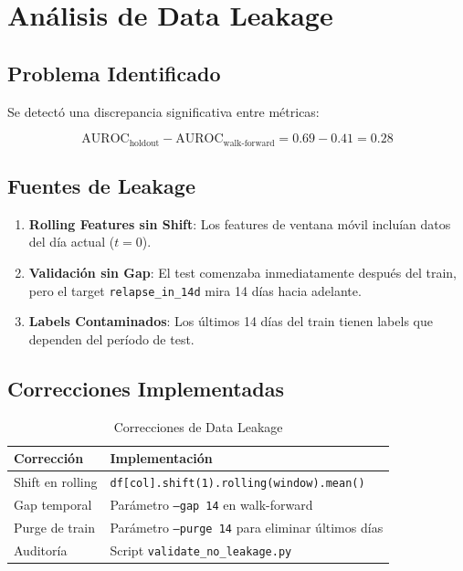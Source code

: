\documentclass[11pt,a4paper]{article}
\begin{document}
\section{Análisis de Data Leakage}

\subsection{Problema Identificado}

Se detectó una discrepancia significativa entre métricas:

\begin{equation}
\text{AUROC}_{\text{holdout}} - \text{AUROC}_{\text{walk-forward}} = 0.69 - 0.41 = 0.28
\end{equation}

\subsection{Fuentes de Leakage}

\begin{enumerate}
    \item \textbf{Rolling Features sin Shift}: Los features de ventana móvil incluían datos del día actual ($t=0$).
    
    \item \textbf{Validación sin Gap}: El test comenzaba inmediatamente después del train, pero el target \texttt{relapse\_in\_14d} mira 14 días hacia adelante.
    
    \item \textbf{Labels Contaminados}: Los últimos 14 días del train tienen labels que dependen del período de test.
\end{enumerate}

\subsection{Correcciones Implementadas}

\begin{table}[H]
\centering
\caption{Correcciones de Data Leakage}
\begin{tabular}{lp{8cm}}
\toprule
\textbf{Corrección} & \textbf{Implementación} \\
\midrule
Shift en rolling & \texttt{df[col].shift(1).rolling(window).mean()} \\
Gap temporal & Parámetro \texttt{--gap 14} en walk-forward \\
Purge de train & Parámetro \texttt{--purge 14} para eliminar últimos días \\
Auditoría & Script \texttt{validate\_no\_leakage.py} \\
\bottomrule
\end{tabular}
\end{table}
\end{document}
